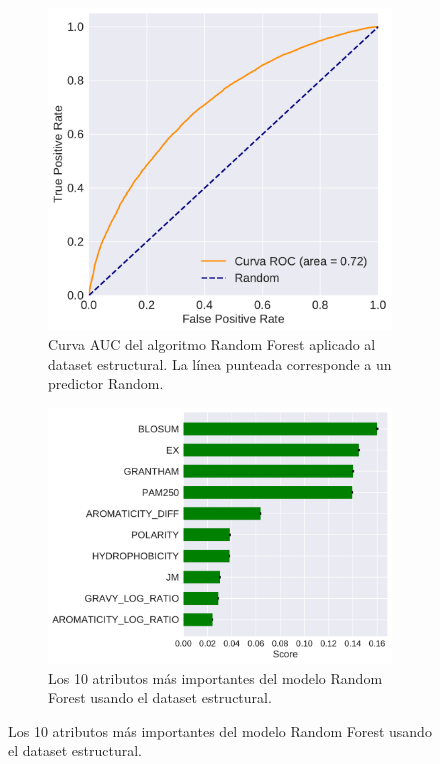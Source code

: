 \begin{figure}[H]
\centering
\begin{subfigure}[b]{0.8\textwidth}
    \centering
    \includegraphics[width=\textwidth]{documents/latex/figures/3/structural/auc_structural.pdf}
    \caption{Curva AUC del algoritmo Random Forest aplicado al dataset estructural. La línea punteada corresponde a un predictor Random.}
    \label{fig:auc_structural}
\end{subfigure}

\hfill
\hfill

\begin{subfigure}[b]{\textwidth}
    \centering
    \includegraphics[width=\textwidth]{documents/latex/figures/3/structural/importances_structural.pdf}
    \caption{Los 10 atributos más importantes del modelo Random Forest usando el dataset estructural.}
    \label{fig:importances_structural}
\end{subfigure}

\end{figure}

